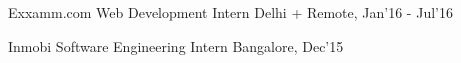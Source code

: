 \begin{cventries}
	\cventry
	{Exxamm.com}
	{Web Development Intern}
	{Delhi + Remote, Jan'16 - Jul'16}
	{}
	{}
	{}

	\cventry
	{Inmobi}
	{Software Engineering Intern}
	{Bangalore, Dec'15}
	{}
	{}
	{}

\end{cventries}
